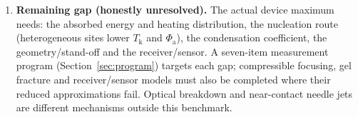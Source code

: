 \begin{enumerate}[leftmargin=*,itemsep=2pt]
homogeneous-nucleation probability under the adopted capillarity/rate assumptions.
\item \textbf{Remaining gap (honestly unresolved).} The actual device maximum needs: the absorbed energy and
heating distribution, the nucleation route (heterogeneous sites lower $T_{\mathrm k}$ and $\Phi_{\mathrm a}$), the
condensation coefficient, the geometry/stand-off and the receiver/sensor. A seven-item measurement program
(Section~\ref{sec:program}) targets each gap; compressible focusing, gel fracture and receiver/sensor
models must also be completed where their reduced approximations fail. Optical breakdown and
near-contact needle jets are different mechanisms outside this benchmark.
\end{enumerate}
